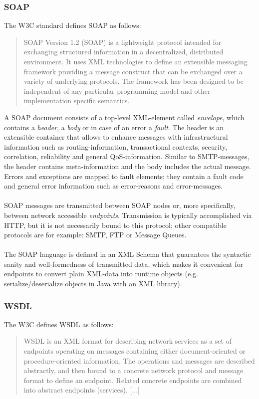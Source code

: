 \subsubsection{SOAP}

The W3C standard defines SOAP as follows:
\begin{quote}
SOAP Version 1.2 (SOAP) is a lightweight protocol intended for exchanging structured information in a decentralized, distributed environment. It uses XML technologies to define an extensible messaging framework providing a message construct that can be exchanged over a variety of underlying protocols. The framework has been designed to be independent of any particular programming model and other implementation specific semantics. \cite{SOAPCORE}
\end{quote}
A SOAP document consists of a top-level XML-element called \emph{envelope}, which contains a \emph{header}, a \emph{body} or in case of an error a \emph{fault}. The header is an extensible container that allows to enhance messages with infrastructural information such as routing-information, transactional contexts, security, correlation, reliability and general QoS-information. Similar to SMTP-messages, the header contains meta-information and the body includes the actual message. Errors and exceptions are mapped to fault elements; they contain a fault code and general error information such as error-reasons and error-messages.
\\ \\
SOAP messages are transmitted between SOAP nodes or, more specifically, between network accessible \emph{endpoints}. Transmission is typically accomplished via HTTP, but it is not necessarily bound to this protocol; other compatible protocols are for example: SMTP, FTP or Message Queues. \cite{BIGREST}
\\ \\
The SOAP language is defined in an XML Schema that guarantees the syntactic sanity and well-formedness of transmitted data, which makes it convenient for endpoints to convert plain XML-data into runtime objects (e.g. serialize/deserialize objects in Java with an XML library).

\subsubsection{WSDL}

The W3C defines WSDL as follows:
\begin{quote}
WSDL is an XML format for describing network services as a set of endpoints operating on messages containing either document-oriented or procedure-oriented information. The operations and messages are described abstractly, and then bound to a concrete network protocol and message format to define an endpoint. Related concrete endpoints are combined into abstract endpoints (services). [...] \cite{WSDLCORE}
\end{quote}

